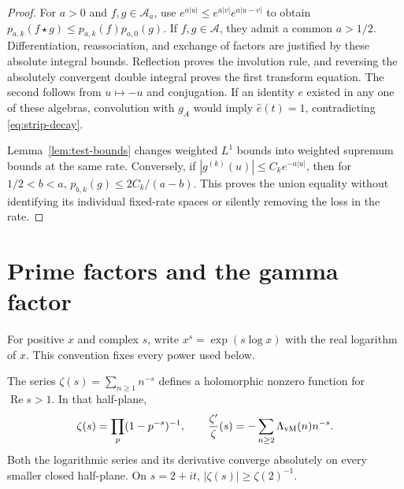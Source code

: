 \documentclass[11pt]{article}
\numberwithin{equation}{section}
\newcommand{\A}{\mathcal A}
\begin{document}
\begin{proof}
For $a>0$ and $f,g\in\A_a$, use
$e^{a|u|}\leq e^{a|v|}e^{a|u-v|}$ to obtain
$p_{a,k}(f\star g)\leq p_{a,k}(f)p_{a,0}(g)$.
If $f,g\in\A$, they admit a common $a>1/2$.
Differentiation, reassociation, and exchange of factors are justified by
these absolute integral bounds.  Reflection proves the involution rule,
and reversing the absolutely convergent double integral proves the first
transform equation.  The second follows from $u\mapsto-u$ and conjugation.
If an identity $e$ existed in any one of these algebras, convolution with
$g_A$ would imply $\widehat e(t)=1$, contradicting \eqref{eq:strip-decay}.

Lemma~\ref{lem:test-bounds} changes weighted $L^1$ bounds into weighted
supremum bounds at the same rate.  Conversely, if
$|g^{(k)}(u)|\leq C_k e^{-a|u|}$, then for $1/2<b<a$,
$p_{b,k}(g)\leq2C_k/(a-b)$.
This proves the union equality without identifying its individual fixed-rate
spaces or silently removing the loss in the rate.
\end{proof}

\section{Prime factors and the gamma factor}
\label{sec:euler-gamma}

For positive $x$ and complex $s$, write $x^s=\exp(s\log x)$ with the real
logarithm of $x$.  This convention fixes every power used below.

\begin{lemma}
\label{lem:euler}
The series $\zeta(s)=\sum_{n\geq1}n^{-s}$ defines a holomorphic nonzero
function for $\operatorname{Re}s>1$.  In that half-plane,
\begin{equation}
 \zeta(s)=\prod_p(1-p^{-s})^{-1},\qquad
 \frac{\zeta'}{\zeta}(s)=-\sum_{n\geq2}\Lambda_{\rm vM}(n)n^{-s}.
 \label{eq:euler}
\end{equation}
Both the logarithmic series and its derivative converge absolutely on every
smaller closed half-plane.  On $s=2+it$, $|\zeta(s)|\geq\zeta(2)^{-1}$.
\end{lemma}
\end{document}
